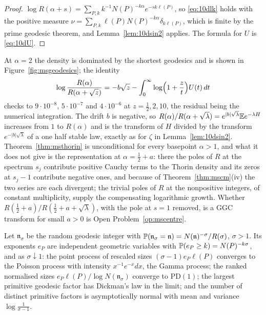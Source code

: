 \begin{proof}
$\log R(\alpha+s)=\sum_{P,k}k^{-1}N(P)^{-k\alpha}e^{-sk\ell(P)}$, so \eqref{eq:10dlk} holds with the positive measure $\nu=\sum_{P,k}\ell(P)N(P)^{-k\alpha}\delta_{k\ell(P)}$, which is finite by the prime geodesic theorem, and Lemma~\ref{lem:10dsin2} applies. The formula for $U$ is \eqref{eq:10dU}.
\end{proof}

At $\alpha=2$ the density is dominated by the shortest geodesics and is shown in Figure~\ref{fig:msgeodesics}; the identity
\[
\log\frac{R(\alpha)}{R(\alpha+\sqrt z)}=-b\sqrt z-\int_0^\infty\log\Bigl(1+\frac zt\Bigr)U(t)\,dt
\]
checks to $9\cdot10^{-8}$, $5\cdot10^{-7}$ and $4\cdot10^{-6}$ at $z=\frac12,2,10$, the residual being the numerical integration. The drift $b$ is negative, so $R(\alpha)/R(\alpha+\sqrt\lambda)=e^{|b|\sqrt\lambda}\mathbb{E} e^{-\lambda H}$ increases from $1$ to $R(\alpha)$ and is the transform of $H$ divided by the transform $e^{-|b|\sqrt\lambda}$ of a one half stable law, exactly as for $\zeta$ in Lemma~\ref{lem:10dsin2}. Theorem~\ref{thm:msthorin} is unconditional for every basepoint $\alpha>1$, and what it does not give is the representation at $\alpha=\frac12+a$: there the poles of $R$ at the spectrum $s_j$ contribute positive Cauchy terms to the Thorin density and its zeros at $s_j-1$ contribute negative ones, and because of Theorem~\ref{thm:mscm}(iv) the two series are each divergent; the trivial poles of $R$ at the nonpositive integers, of constant multiplicity, supply the compensating logarithmic growth. Whether $R(\frac12+a)/R(\frac12+a+\sqrt\lambda)$, with the pole at $s=1$ removed, is a GGC transform for small $a>0$ is Open Problem~\ref{op:mscentre}.

\begin{theorem}\label{thm:mspd}
Let $\mathfrak n_\sigma$ be the random geodesic integer with $\mathbb{P}(\mathfrak n_\sigma=\mathfrak n)=N(\mathfrak n)^{-\sigma}/R(\sigma)$, $\sigma>1$. Its exponents $e_P$ are independent geometric variables with $\mathbb{P}(e_P\ge k)=N(P)^{-k\sigma}$, and as $\sigma\downarrow1$: the point process of rescaled sizes $(\sigma-1)e_P\ell(P)$ converges to the Poisson process with intensity $x^{-1}e^{-x}dx$, the Gamma process; the ranked normalised sizes $e_P\ell(P)/\log N(\mathfrak n_\sigma)$ converge to $\mathrm{PD}(1)$; the largest primitive geodesic factor has Dickman's law in the limit; and the number of distinct primitive factors is asymptotically normal with mean and variance $\log\frac1{\sigma-1}$.
\end{theorem}

